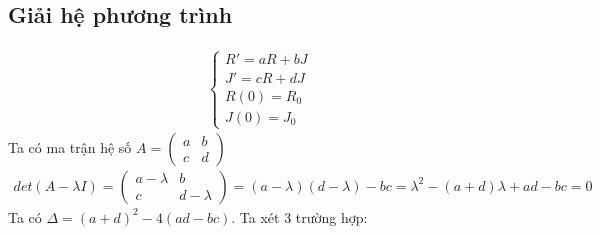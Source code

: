 \subsection{Giải hệ phương trình}
\begin{align*}
    \begin{cases}
        R'=aR+bJ\\
        J'=cR+dJ\\
        R(0)=R_0\\
        J(0)=J_0
    \end{cases}
\end{align*}
Ta có ma trận hệ số $A=\begin{pmatrix}
                            a & b\\
                            c & d
                        \end{pmatrix}$\\
\begin{align}
    det(A-\lambda{I})=\begin{pmatrix}
                        a-\lambda & b\\
                        c         & d-\lambda
                    \end{pmatrix}
                  = (a-\lambda)(d-\lambda) - bc = \lambda^2 - (a + d)\lambda + ad - bc = 0
\end{align}
Ta có $\Delta = (a + d)^2-4(ad - bc)$. Ta xét 3 trường hợp:
